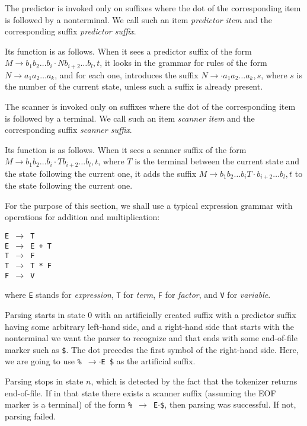 \documentclass[11pt]{article}
\def\ra{\rightarrow}
\begin{document}
The predictor is invoked only on suffixes where the dot of the
corresponding item is followed by a nonterminal.  We call such an item
\emph{predictor item} and the corresponding suffix \emph{predictor
suffix}.

Its function is as follows.  When it sees a predictor suffix of the
form $M \ra b_1 b_2 \ldots b_i \cdot N b_{i+2} \ldots b_l, t$, it
looks in the grammar for rules of the form $N \ra a_1 a_2 \ldots a_k$,
and for each one, introduces the suffix $N \ra \cdot a_1 a_2 \ldots
a_k, s$, where $s$ is the number of the current state, unless such a
suffix is already present. 

The scanner is invoked only on suffixes where the dot of the
corresponding item is followed by a terminal.  We call such an item
\emph{scanner item} and the corresponding suffix \emph{scanner
suffix}.

Its function is as follows.  When it sees a scanner suffix of the form
$M \ra b_1 b_2 \ldots b_i \cdot T b_{i+2} \ldots b_l, t$, where $T$ is
the terminal between the current state and the state following the
current one, it adds the suffix $M \ra b_1 b_2 \ldots b_i T \cdot
b_{i+2} \ldots b_l, t$ to the state following the current one.

For the purpose of this section, we shall use a typical expression
grammar with operations for addition and multiplication:

\texttt{E $\ra$ T\\E $\ra$ E + T\\T $\ra$ F\\T $\ra$ T * F\\F $\ra$ V} 

where \texttt{E} stands for \emph{expression}, \texttt{T} for
\emph{term}, \texttt{F} for \emph{factor}, and \texttt{V} for
\emph{variable}. 

Parsing starts in state $0$ with an artificially created suffix with a
predictor suffix having some arbitrary left-hand side, and a right-hand
side that starts with the nonterminal we want the parser to recognize
and that ends with some end-of-file marker such as \texttt{\$}.  The
dot precedes the first symbol of the right-hand side.  Here, we are
going to use \texttt{\% $\rightarrow$$\cdot$E \$} as the artificial
suffix. 

Parsing stops in state $n$, which is detected by the fact that the
tokenizer returns end-of-file.  If in that state there exists a
scanner suffix (assuming the EOF marker is a terminal) of the form
\texttt{\% $\rightarrow$ E$\cdot$\$}, then parsing was successful.  If
not, parsing failed.  
\end{document}
